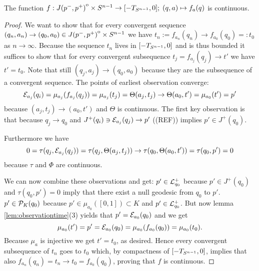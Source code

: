 


\begin{proposition}\label{prop:fcont} 
    The function $f:{\kern0ptJ(p^-,p^+)}^{\mathrm{o}}\times{S^{n-1}}\to[-T_{S^{n-1}},0];\; (q,a)\mapsto f_a(q)$ is continuous.
\end{proposition}
\begin{proof}
    We want to show that for every convergent sequence $(q_n,a_n)\to (q_0,a_0)\in {\kern0ptJ(p^-,p^+)}^{\mathrm{o}}\times {S^{n-1}}$ we have $t_n:=f_{a_n}(q_n)\to f_{a_0}(q_0)=:t_0$ as $n \to \infty$. Because the sequence $t_n$ lives in $[-T_{S^{n-1}},0]$ and is thus bounded it suffices to show that for every convergent subsequence $t_j = f_{a_j}(q_j) \to t'$ we have $t'=t_0$. Note that still $(q_j,a_j)\to (q_0,a_0)$ because they are the subsequence of a convergent sequence. The points of earliest observation converge:
    \[
        {\mathcal{E}}_{a_j}(q_i) = \mu_{a_j}(f_{a_j}(q_j)) = \mu_{a_j}(t_j) = \Theta(a_j,t_j) \to \Theta(a_0,t') = \mu_{a_0}(t')=p'
    \] because $(a_j,t_j)\to (a_0,t')$ and $\Theta$ is continuous.
    The first key observation is that  because $q_j\to q_0$ and $J^+(q_i)\ni{\mathcal{E}}_{a_j}(q_j) \to  p'$ ((REF)) implies $p'\in J^+(q_0)$.

    Furthermore we have
    \[
        0=\tau(q_j,{\mathcal{E}}_{a_j}(q_j))=\tau(q_j,\Theta(a_j,t_j))\to \tau(q_0,\Theta(a_0,t')) = \tau(q_0,p')=0
    \] because $\tau$ and $\Phi$ are continuous.

    We can now combine these observations and get: $p'\in {\mathcal{L}}^+_{q_0}$ because $p'\in J^+(q_0)$ and $\tau(q_0,p')=0$ imply that there exist a null geodesic from $q_0$ to $p'$. $p'\in {\mathcal{P}}_K(q_0)$ because $p'\in \mu_{a_0}([0,1])\subset K$ and $p'\in {\mathcal{L}}^+_{q_0}$. But now lemma \ref{lem:observationtime}(3) yields that $p'={\mathcal{E}}_{a_0}(q_0)$ and we get 
    \[
        \mu_{a_0}(t') = p' = {\mathcal{E}}_{a_0}(q_0) = \mu_{a_0}(f_{a_0}(q_0))= \mu_{a_0}(t_0).
    \]
    Because $\mu_a$ is injective we get $t'=t_0$, as desired. Hence every convergent subsequence of $t_n$ goes to $t_0$ which, by compactness of $[-T_{S^{n-1}},0]$, implies that also $f_{a_n}(q_n)=t_n \to t_0 = f_{a_0}(q_0)$, proving that $f$ is continuous.
\end{proof}

